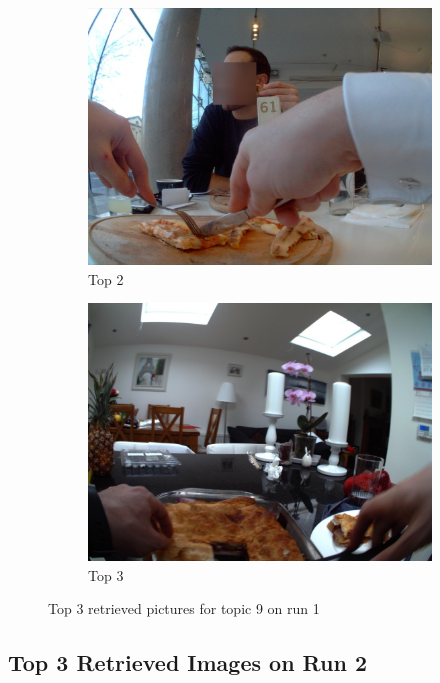 \begin{figure}[H]
\begin{subfigure}{0.32\textwidth}
  \end{subfigure}
  \begin{subfigure}{0.32\textwidth}
  \includegraphics[width=\textwidth]{Sections/7Results/images/top2.jpg}\hfill
  \caption{Top 2}
  \end{subfigure}
  \begin{subfigure}{0.32\textwidth}
  \includegraphics[width=\textwidth]{Sections/7Results/images/top3.jpg}\hfill
    \caption{Top 3}
  \end{subfigure}
  \caption{Top 3 retrieved pictures for topic 9 on run 1}
\end{figure}


\subsection{Top 3 Retrieved Images on Run 2}

